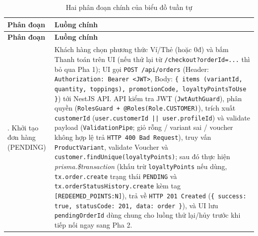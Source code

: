 \documentclass[12pt,a4paper]{report}
\begin{document}
\begin{longtable}{>{\raggedright\arraybackslash}p{4.0cm}>{\raggedright\arraybackslash}p{11.2cm}}
\caption{Hai phân đoạn chính của biểu đồ tuần tự}\\
\hline
\rowcolor{gray!20} \textbf{Phân đoạn} & \textbf{Luồng chính} \\
\hline
\endfirsthead
\hline
\rowcolor{gray!20} \textbf{Phân đoạn} & \textbf{Luồng chính} \\
\hline
\endhead
1. Khởi tạo đơn hàng (PENDING) & Khách hàng chọn phương thức Ví/Thẻ (hoặc 0đ) và bấm Thanh toán trên UI (nếu thử lại từ \texttt{/checkout?orderId=...} thì bỏ qua Pha 1); UI gọi \texttt{POST /api/orders} (Header: \texttt{Authorization: Bearer <JWT>}, Body: \texttt{\{ items (variantId, quantity, toppings), promotionCode, loyaltyPointsToUse \}}) tới NestJS API. API kiểm tra JWT (\texttt{JwtAuthGuard}), phân quyền (\texttt{RolesGuard + @Roles(Role.CUSTOMER)}), trích xuất \texttt{customerId} (\texttt{user.customerId || user.profileId}) và validate payload (\texttt{ValidationPipe}; giỏ rỗng / variant sai / voucher không hợp lệ trả \texttt{HTTP 400 Bad Request}), truy vấn \texttt{ProductVariant}, validate Voucher và \texttt{customer.findUnique(loyaltyPoints)}; sau đó thực hiện \textit{prisma.\$transaction} (khấu trừ \texttt{loyaltyPoints} nếu dùng, \texttt{tx.order.create} trạng thái \texttt{PENDING} và \texttt{tx.orderStatusHistory.create} kèm tag \texttt{[REDEEMED\_POINTS:N]}), trả về \texttt{HTTP 201 Created} (\texttt{\{ success: true, statusCode: 201, data: order \}}), và UI lưu \texttt{pendingOrderId} dùng chung cho luồng thử lại/hủy trước khi tiếp nối ngay sang Pha 2. \\
\hline

\end{longtable}
\end{document}
